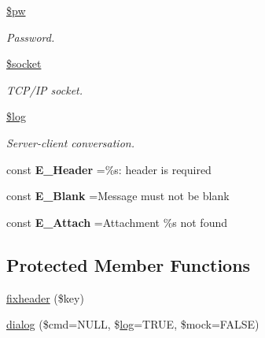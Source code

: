 \begin{DoxyCompactItemize}
\hyperlink{class_s_m_t_p_a4a84bb9d73addd9e90f2f34c36035df4}{\$pw}
\begin{DoxyCompactList}\small\item\em Password. \end{DoxyCompactList}\item 
\hypertarget{class_s_m_t_p_a33a9dcf5eaeebf833f2390060f8caf5e}{}\label{class_s_m_t_p_a33a9dcf5eaeebf833f2390060f8caf5e} 
\hyperlink{class_s_m_t_p_a33a9dcf5eaeebf833f2390060f8caf5e}{\$socket}
\begin{DoxyCompactList}\small\item\em T\+C\+P/\+IP socket. \end{DoxyCompactList}\item 
\hypertarget{class_s_m_t_p_a9a2cf15a653aee8be437f7ae474cd494}{}\label{class_s_m_t_p_a9a2cf15a653aee8be437f7ae474cd494} 
\hyperlink{class_s_m_t_p_a9a2cf15a653aee8be437f7ae474cd494}{\$log}
\begin{DoxyCompactList}\small\item\em Server-\/client conversation. \end{DoxyCompactList}\end{DoxyCompactItemize}
{\bf }\par
\begin{DoxyCompactItemize}
\item 
\hypertarget{class_s_m_t_p_a3ea1a09993798da7eba3b05e89fca4c2}{}\label{class_s_m_t_p_a3ea1a09993798da7eba3b05e89fca4c2} 
const {\bfseries E\+\_\+\+Header} =\textquotesingle{}\%s\+: header is required\textquotesingle{}
\item 
\hypertarget{class_s_m_t_p_ae837eb485f6bf62b8bbe8e9007c04cb2}{}\label{class_s_m_t_p_ae837eb485f6bf62b8bbe8e9007c04cb2} 
const {\bfseries E\+\_\+\+Blank} =\textquotesingle{}Message must not be blank\textquotesingle{}
\item 
\hypertarget{class_s_m_t_p_aedc0129d8cb1011801aee1950c279caf}{}\label{class_s_m_t_p_aedc0129d8cb1011801aee1950c279caf} 
const {\bfseries E\+\_\+\+Attach} =\textquotesingle{}Attachment \%s not found\textquotesingle{}
\end{DoxyCompactItemize}

\subsection*{Protected Member Functions}
\begin{DoxyCompactItemize}
\item 
\hyperlink{class_s_m_t_p_afee77a9b8498c6a0875b75ae7313e545}{fixheader} (\$key)
\item 
\hyperlink{class_s_m_t_p_ab57e2499b18f17f0cf67e12d546ad225}{dialog} (\$cmd=N\+U\+LL, \$\hyperlink{class_s_m_t_p_a5e06d9b7f0033278f40a41d081efbe71}{log}=T\+R\+UE, \$mock=F\+A\+L\+SE)
\end{DoxyCompactItemize}
